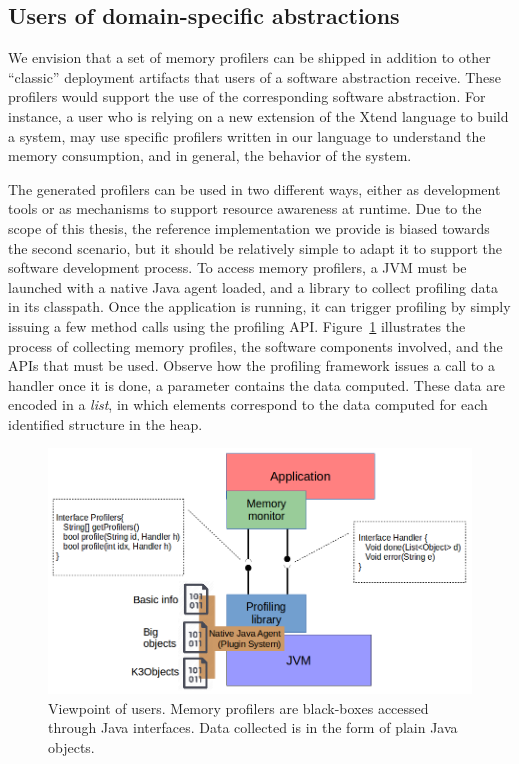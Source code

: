 \subsection{Users of domain-specific abstractions} \label{sec:dsl-tooling-users}

We envision that a set of memory profilers can be shipped in addition to other ``classic'' deployment artifacts that users of a software abstraction receive. 
These profilers would support the use of the corresponding software abstraction.
For instance, a user who is relying on a new extension of the Xtend language to build a system, may use specific profilers written in our language to understand the memory consumption, and in general, the behavior of the system.

The generated profilers can be used in two different ways, either as development tools or as mechanisms to support resource awareness at runtime.
Due to the scope of this thesis, the reference implementation we provide is biased towards the second scenario, but it should be relatively simple to adapt it to support the software development process.
To access memory profilers, a JVM must be launched with a native Java agent loaded, and a library to collect profiling data in its classpath.
Once the application is running, it can trigger profiling by simply issuing a few method calls using the profiling API.
Figure~\ref{fig:user-profiling-library-view} illustrates the process of collecting memory profiles, the software components involved, and the APIs that must be used.
Observe how the profiling framework issues a call to a handler once it is done, a parameter contains the data computed.
These data are encoded in a \textit{list}, in which elements correspond to the data computed for each identified structure in the heap.

\begin{figure}[!t]
\centering
\includegraphics[scale=0.5]{./chapter6/fig/user-profiler-view.png}
\caption{Viewpoint of users. Memory profilers are black-boxes accessed through Java interfaces. Data collected is in the form of plain Java objects.}\label{fig:user-profiling-library-view}
\end{figure}

